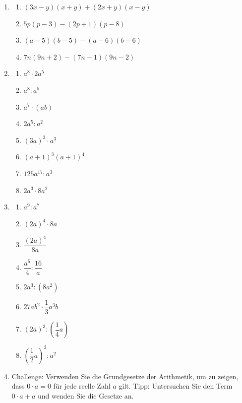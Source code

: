\begin{ueb}
\begin{enumerate}
        \item
              \begin{enumerate}
                  \item \((3x-y)(x+y)+(2x+y)(x-y)\)
                  \item \(5p(p-3)-(2p+1)(p-8)\)
                  \item \((a-5)(b-5)-(a-6)(b-6)\)
                  \item \(7n(9n+2)-(7n-1)(9n-2)\)
              \end{enumerate}
        \item
              \begin{enumerate}
                  \item \(a^8\cdot 2a^5\)
                  \item \(a^8:a^5\)
                  \item \(a^7\cdot(ab)\)
                  \item \(2a^5:a^2\)
                  \item \((3a)^3\cdot a^3\)
                  \item \((a+1)^3(a+1)^4\)
                  \item \(125a^{17}:a^3\)
                  \item \(2a^3\cdot8a^2\)
              \end{enumerate}

        \item
              \begin{enumerate}
                  \item \(a^9:a^7\)
                  \item \((2a)^4\cdot8a\)
                  \item \(\dfrac{(2a)^4}{8a}\)
                  \item \(\dfrac{a^5}{4}:\dfrac{16}{a}\)
                  \item \(2a^3:(8a^2)\)
                  \item \(27ab^2\cdot\dfrac{1}{3}a^3b\)
                  \item \((2a)^3:\left(\dfrac{1}{4}a\right)\)
                  \item \(\left(\dfrac{1}{2}a\right)^3:a^2\)
              \end{enumerate}
        \item Challenge: Verwenden Sie die Grundgesetze der Arithmetik, um zu zeigen, dass \(0 \cdot a = 0\) für jede reelle Zahl \(a\) gilt. Tipp: Untersuchen Sie den Term \(0 \cdot a + a\) und wenden Sie die Gesetze an.
    \end{enumerate}
\end{ueb}
